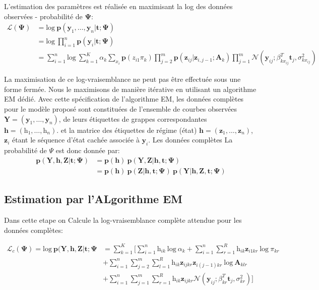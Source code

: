 \documentclass[11pt]{article}
\newcommand{\cL}{\mathcal{L}}
\newcommand{\cN}{\mathcal{N}}
\newcommand{\bsy}{\boldsymbol{y}}
\newcommand{\bsp}{\boldsymbol{p}}
\newcommand{\bsz}{\boldsymbol{z}}
\newcommand{\bst}{\boldsymbol{t}}
\newcommand{\bsA}{\boldsymbol{A}}
\newcommand{\bsh}{\boldsymbol{h}}
\newcommand{\ciz}{\textit{z}}
\newcommand{\cih}{\textit{h}}
\newcommand{\sumn}{\sum_{i=1}^{n}}
\newcommand{\sumK}{\sum_{k=1}^{K}}
\newcommand{\sumR}{\sum_{r=1}^{R}}
\newcommand{\bY}{\mathbf{Y}}
\newcommand{\bZ}{\mathbf{Z}}
\newcommand{\bA}{\mathbf{A}}
\newcommand{\bsPsi}{\boldsymbol{\Psi}}
\begin{document}
L’estimation des paramètres est réalisée en maximisant la log des données observées - probabilité de $\bsPsi$: \\

\begin{equation}
\begin{aligned}
\cL (\bsPsi) &= \text{log}\ \bsp(\bsy_{1},\dots,\bsy_{n} |\bst;\bsPsi )\\
 &= \text{log} \ \prod_{i=1}^{n}\bsp(\bsy_{i}|\bst;\bsPsi) \\
&= \sumn \text{log} \ \sumK \alpha_{k} \sum_{x_{i}}\bsp(\ciz_{i1}\pi_{k}) \prod_{j=2}^{m}\bsp(\bsz_{ij}|\bsz_{i,j-1};\bsA_{k}) \prod_{j=1}^{m}\cN ( \bsy_{ij} ;\beta_{kx_{ij}}^{T}\bst_{j}, \sigma_{kx_{ij}}^{2})
\end{aligned}
\end{equation}

La maximisation de ce log-vraisemblance ne peut pas être effectuée sous une forme fermée. Nous le maximisons de manière itérative en utilisant un algorithme EM dédié. Avec cette spécification de l'algorithme EM, les données complètes pour le modèle proposé sont constituées de l'ensemble de courbes observées $\bY = (\bsy_{1},\dots, \bsy_{n})$, de leurs étiquettes de grappes correspondantes $\bsh = (\cih_{1},\dots, \cih_{n})$. et la matrice des étiquettes de régime (état) $\bsh = (\bsz_{1},\dots, \bsz_{n})$, $\bsz_{i}$ étant le séquence d'état cachée associée à $\bsy_{i}$. Les données complètes La probabilité de $\Psi$ est donc donnée par: \\

\begin{equation}
\begin{aligned}
\bsp(\bY,\bsh,\bZ|\bst;\bsPsi) &= \bsp(\bsh) \ \bsp(\bY,\bZ|\bsh,\bst;\bsPsi) \\
 &=  \bsp(\bsh) \ \bsp(\bZ|\bsh,\bst;\bsPsi) \ \bsp(\bY|\bsh,\bZ,\bst;\bsPsi)
\end{aligned}
\end{equation}



\subsection{Estimation  par l'ALgorithme EM}

Dans cette etape on Calcule la log-vraisemblance complète attendue pour les données complètes:

\begin{equation}
\begin{aligned}
\cL_{c}(\bsPsi) = \text{log} \ \bsp(\bY,\bsh,\bZ|\bst;\bsPsi &= \sumK \Bigg[ \sumn \cih_{ik} \ \text{log} \ \alpha_{k} + \sumn \sumR\cih_{ik}\bsz_{i1kr} \ \text{log} \ \pi_{kr} \\ 
&+ \sumn \sum_{j=2}^{m} \sum_{l=1}^{R} \cih_{ik}\bsz_{ijkr}\bsz_{i(j-1)kr} \ \text{log} \ \bA_{klr} \\
&+ \sumn \sum_{j=1}^{m} \sumR \cih_{ik}\bsz_{ijkr}\cN ( \bsy_{ij} ;\beta_{kr}^{T}\bst_{j}, \sigma_{kr}^{2}) \Bigg]
\end{aligned}
\end{equation}
\end{document}
